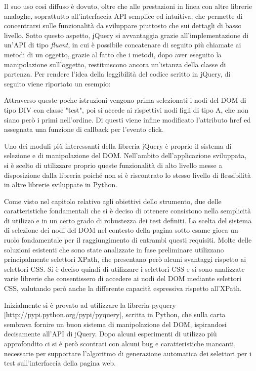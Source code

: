 \documentclass[12pt]{toptesi}
\begin{document}
Il suo uso così diffuso è dovuto, oltre che alle prestazioni in linea con altre librerie analoghe, soprattutto all'interfaccia API semplice ed intuitiva, che permette di concentrarsi sulle funzionalità da sviluppare piuttosto che sui dettagli di basso livello. Sotto questo aspetto, jQuery si avvantaggia grazie all'implementazione di un'API di tipo \emph{fluent}, in cui è possibile concatenare di seguito più chiamate ai metodi di un oggetto, grazie al fatto che i metodi, dopo aver eseguito la manipolazione sull'oggetto, restituiscono ancora un'istanza della classe di partenza. Per rendere l'idea della leggibilità del codice scritto in jQuery, di seguito viene riportato un esempio:



Attraverso queste poche istruzioni vengono prima selezionati i nodi del DOM di tipo DIV con classe "test", poi si accede ai rispettivi nodi figli di tipo A, che non siano però i primi nell'ordine. Di questi viene infine modificato l'attributo href ed assegnata una funzione di callback per l'evento click. 

Uno dei moduli più interessanti della libreria jQuery è proprio il sistema di selezione e di manipolazione del DOM. Nell'ambito dell'applicazione sviluppata, si è scelto di utilizzare proprio queste funzionalità di alto livello messe a disposizione dalla libreria poiché non si è riscontrato lo stesso livello di flessibilità in altre librerie sviluppate in Python.

Come visto nel capitolo relativo agli obiettivi dello strumento, due delle caratteristiche fondamentali che si è deciso di ottenere consistono nella semplicità di utilizzo e in un certo grado di robustezza dei test definiti. La scelta del sistema di selezione dei nodi del DOM nel contesto della pagina sotto esame gioca un ruolo fondamentale per il raggiungimento di entrambi questi requisiti. Molte delle soluzioni esistenti che sono state analizzate in fase preliminare utilizzano principalmente selettori XPath, che presentano però alcuni svantaggi rispetto ai selettori CSS. Si è deciso quindi di utilizzare i selettori CSS e si sono analizzate varie librerie che consentissero di accedere ai nodi del DOM mediante selettori CSS, valutando però anche la differente capacità espressiva rispetto all'XPath.

Inizialmente si è provato ad utilizzare la libreria pyquery [http://pypi.python.org/pypi/pyquery], scritta in Python, che sulla carta sembrava fornire un buon sistema di manipolazione del DOM, ispirandosi decisamente all'API di jQuery. Dopo alcuni esperimenti di utilizzo più approfondito ci si è però scontrati con alcuni bug e caratteristiche mancanti, necessarie per supportare l'algoritmo di generazione automatica dei selettori per i test sull'interfaccia della pagina web. 
\end{document}
